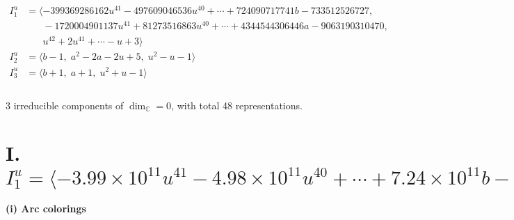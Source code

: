 \documentclass[1p]{elsarticle_modified}
\theoremstyle{definition}
\begin{document}
\begin{align*}
I^u_{1}&=\langle 
-399369286162 u^{41}-497609046536 u^{40}+\cdots+724090717741 b-733512526727,\\
\phantom{I^u_{1}}&\phantom{= \langle  }-1720004901137 u^{41}+81273516863 u^{40}+\cdots+4344544306446 a-9063190310470,\\
\phantom{I^u_{1}}&\phantom{= \langle  }u^{42}+2 u^{41}+\cdots- u+3\rangle \\
I^u_{2}&=\langle 
b-1,\;a^2-2 a-2 u+5,\;u^2- u-1\rangle \\
I^u_{3}&=\langle 
b+1,\;a+1,\;u^2+u-1\rangle \\
\\
\end{align*}
\raggedright * 3 irreducible components of $\dim_{\mathbb{C}}=0$, with total 48 representations.\\
\newpage
\renewcommand{\arraystretch}{1}
\centering \section*{I. $I^u_{1}= \langle -3.99\times10^{11} u^{41}-4.98\times10^{11} u^{40}+\cdots+7.24\times10^{11} b-7.34\times10^{11},\;-1.72\times10^{12} u^{41}+8.13\times10^{10} u^{40}+\cdots+4.34\times10^{12} a-9.06\times10^{12},\;u^{42}+2 u^{41}+\cdots- u+3 \rangle$}
\flushleft \textbf{(i) Arc colorings}\\
\end{document}
